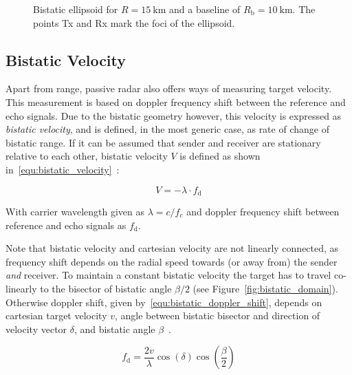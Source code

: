 \begin{figure}[htb]
    \centering
    \begin{tikzpicture}
        
    \end{tikzpicture}
    \caption{Bistatic ellipsoid for \(R=\SI{15}{\kilo\metre}\) and a baseline of \(R_{\text{b}}=\SI{10}{\kilo\metre}\). The points Tx and Rx mark the foci of the ellipsoid.}\label{fig:bistatic_ellipsoid}
\end{figure}

\subsection{Bistatic Velocity}

Apart from range, passive radar also offers ways of measuring target velocity. This measurement is based on doppler frequency shift between the reference and echo signals. Due to the bistatic geometry however, this velocity is expressed as \emph{bistatic velocity}, and is defined, in the most generic case, as rate of change of bistatic range. If it can be assumed that sender and receiver are stationary relative to each other, bistatic velocity \(V\) is defined as shown in~\ref{equ:bistatic_velocity}~\cite[p.~12]{Malanowski2019}:

\begin{equation}\label{equ:bistatic_velocity}
    V = -\lambda \cdot f_{\text{d}}
\end{equation}

With carrier wavelength given as \(\lambda = c / f_{c}\) and doppler frequency shift between reference and echo signals as \(f_{\text{d}}\).

Note that bistatic velocity and cartesian velocity are not linearly connected, as frequency shift depends on the radial speed towards (or away from) the sender \emph{and} receiver. To maintain a constant bistatic velocity the target has to travel co-linearly to the bisector of bistatic angle \(\beta/2\) (see Figure~\ref{fig:bistatic_domain}). Otherwise doppler shift, given by~\ref{equ:bistatic_doppler_shift}, depends on cartesian target velocity \(v\), angle between bistatic bisector and direction of velocity vector \(\delta\), and bistatic angle \(\beta\)~\cite[p.~39]{Griffiths2017}.

\begin{equation}\label{equ:bistatic_doppler_shift}
    f_{\text{d}} = \frac{2v}{\lambda} \cos{\left(\delta\right)}\cos{\left(\frac{\beta}{2}\right)}
\end{equation}

